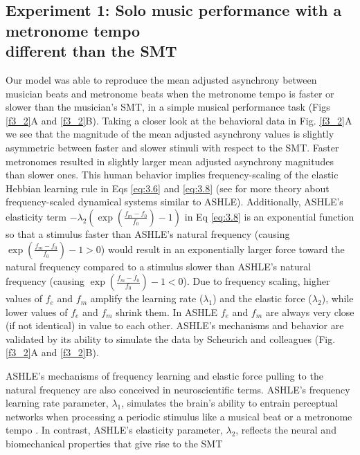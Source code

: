 \documentclass{report}
\begin{document}
\subsection{Experiment 1: Solo music performance with a metronome tempo \\ different than the SMT}

Our model was able to reproduce the mean adjusted asynchrony between musician beats and metronome beats when the metronome tempo is faster or slower than the musician's SMT, in a simple musical performance task (Figs \ref{f3_2}A and \ref{f3_2}B). Taking a closer look at the behavioral data in Fig.{} \ref{f3_2}A we see that the magnitude of the mean adjusted asynchrony values is slightly asymmetric between faster and slower stimuli with respect to the SMT. Faster metronomes resulted in slightly larger mean adjusted asynchrony magnitudes than slower ones. This human behavior implies frequency-scaling of the elastic Hebbian learning rule in Eqs \eqref{eq:3.6} and \eqref{eq:3.8} (see \cite{kim2015signal, large2010canonical} for more theory about frequency-scaled dynamical systems similar to ASHLE). Additionally, ASHLE's elasticity term $-\lambda_2\left(\exp\left(\frac{f_m-f_0}{f_0}\right)-1\right)$ in Eq \eqref{eq:3.8} is an exponential function so that a stimulus faster than ASHLE's natural frequency (causing $\exp\left(\frac{f_m-f_0}{f_0}\right)-1>0$) would result in an exponentially larger force toward the natural frequency compared to a stimulus slower than ASHLE's natural frequency (causing $\exp\left(\frac{f_m-f_0}{f_0}\right)-1<0$). Due to frequency scaling, higher values of $f_e$ and $f_m$ amplify the learning rate ($\lambda_1$) and the elastic force ($\lambda_2$), while lower values of $f_e$ and $f_m$ shrink them. In ASHLE $f_e$ and $f_m$ are always very close (if not identical) in value to each other. ASHLE's mechanisms and behavior are validated by its ability to simulate the data by Scheurich and colleagues \cite{scheurich2018tapping} (Fig.{} \ref{f3_2}A and \ref{f3_2}B).

ASHLE's mechanisms of frequency learning and elastic force pulling to the natural frequency are also conceived in neuroscientific terms. ASHLE's frequency learning rate parameter, $\lambda_1$, simulates the brain's ability to entrain perceptual networks when processing a periodic stimulus like a musical beat or a metronome tempo \cite{large2015neural}. In contrast, ASHLE's elasticity parameter, $\lambda_2$, reflects the neural and biomechanical properties that give rise to the SMT \cite{goodman2000advantages}
\end{document}
